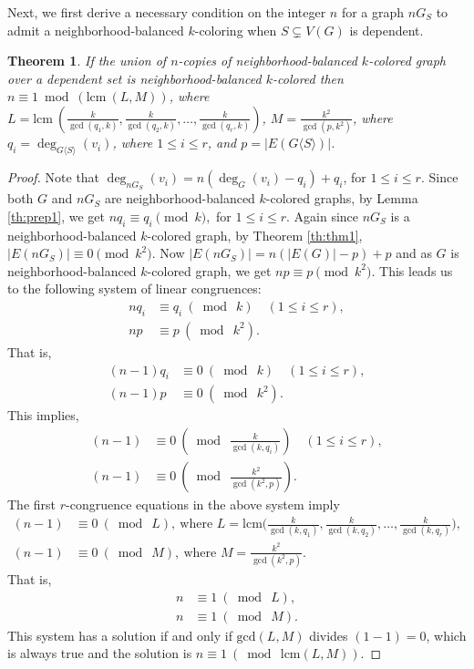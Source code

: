 \documentclass[12pt]{article}
\newtheorem{theorem}{Theorem}[section]
\newcommand{\nbc}{neighborhood-balanced $k$-coloring\xspace}
\newcommand{\nbcd}{neighborhood-balanced $k$-colored\xspace}
\begin{document}
Next, we first derive a necessary condition on the integer $n$ for a graph $nG_S$ to admit a \nbc when $S \subsetneq V(G)$ is dependent.

\begin{theorem}\label{th: unionoversepset}
If the union of $n$-copies of \nbcd graph over a dependent set is \nbcd then $n\equiv 1 \bmod(\mathrm{lcm}\ (L,M))$, where $L = \mathrm{lcm}\ \left( \frac{k}{\gcd(q_1, k)}, \frac{k}{\gcd(q_2, k)}, \dots, \frac{k}{\gcd(q_r, k)} \right)$, $M = \frac{k^2}{\gcd(p, k^2)}$, where $q_i = \deg_{G\langle S \rangle}(v_i)$,  where $1 \le i \le r$, and  $p = |E(G\langle S \rangle)|$.
\end{theorem}
\begin{proof}
    Note that $\deg_{nG_S}(v_i) = n(\deg_G(v_i)-q_i) + q_i$, for $1 \leq i \leq r$.
    Since both $G$ and $nG_S$ are \nbcd graphs, by Lemma \ref{th:prep1}, we get $nq_i \equiv q_i\pmod{k},$ for $1\leq i \leq r$.
    Again since $nG_S$ is a \nbcd graph, by Theorem \ref{th:thm1}, $|E(nG_S)| \equiv 0 \pmod{k^2}$.
    Now $|E(nG_S)|= n(|E(G)|-p) + p$ and as $G$ is \nbcd graph, we get $np \equiv p \pmod{k^2}$. 
    This leads us to the following system of linear congruences:
    \begin{align*}
        nq_i &\equiv q_i\ (\bmod\ k) \quad (1\leq i \leq r), \\
        np &\equiv p\ (\bmod\ k^2).
    \end{align*}
    That is, 
    \begin{align*}
        (n-1)q_i &\equiv 0\ (\bmod\ k)\quad  (1 \leq i \leq r), \\
        (n-1)p &\equiv 0\ (\bmod\ k^2).
    \end{align*}
    This implies, 
     \begin{align*}
        (n-1) &\equiv 0\ (\bmod\ \tfrac{k}{\gcd(k,q_i)}) \quad  (1 \leq i \leq r) ,\\
        (n-1) &\equiv 0\ (\bmod\ \tfrac{k^2}{\gcd(k^2,p)}).
    \end{align*}
    The first $r$-congruence equations in the above system imply
    \begin{align*}
        (n-1)&\equiv 0\ (\bmod\ L),\ \text{where } L = \mathrm{lcm} \big(\tfrac{k}{\gcd(k, q_1)}, \tfrac{k}{\gcd(k, q_2)},  \dots,\tfrac{k}{ \gcd(k, q_r)}\big),\\
            (n-1)& \equiv 0\ (\bmod\ M),\ \text{where } M = \tfrac{k^2}{\gcd(k^2, p)}.
    \end{align*}
That is, \begin{align*}
    n&\equiv 1\ (\bmod\ L),\\
    n&\equiv 1\ (\bmod\ M).
\end{align*}
This system has a solution if and only if $\mathrm{gcd}(L,M)$ divides $(1-1)=0$, which is always true and the solution is $n\equiv 1\ (\bmod\ \mathrm {lcm}(L,M)).$
\end{proof}
\end{document}
